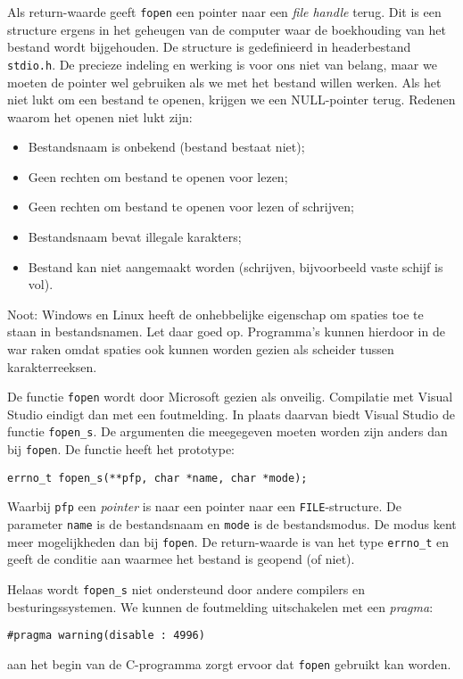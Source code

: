 Als return-waarde geeft \texttt{fopen} een pointer naar een \textsl{file handle} terug. Dit is een structure ergens in het geheugen van de computer waar de boekhouding van het bestand wordt bijgehouden. De structure is gedefinieerd in headerbestand \texttt{stdio.h}. De precieze indeling en werking is voor ons niet van belang, maar we moeten de pointer wel gebruiken als we met het bestand willen werken. Als het niet lukt om een bestand te openen, krijgen we een NULL-pointer terug. Redenen waarom het openen niet lukt zijn: 

\begin{itemize}
\item Bestandsnaam is onbekend (bestand bestaat niet);
\item Geen rechten om bestand te openen voor lezen;
\item Geen rechten om bestand te openen voor lezen of schrijven;
\item Bestandsnaam bevat illegale karakters;
\item Bestand kan niet aangemaakt worden (schrijven, bijvoorbeeld vaste schijf is vol).
\end{itemize}

Noot: Windows en Linux heeft de onhebbelijke eigenschap om spaties toe te staan in bestandsnamen. Let daar goed op. Programma's kunnen hierdoor in de war raken omdat spaties ook kunnen worden gezien als scheider tussen karakterreeksen.


\begin{infobox}
De functie \texttt{fopen} wordt door Microsoft gezien als onveilig. Compilatie met Visual Studio eindigt dan met een foutmelding. In plaats daarvan biedt Visual Studio de functie \texttt{fopen\_s}. De argumenten die meegegeven moeten worden zijn anders dan bij \texttt{fopen}. De functie heeft het prototype:

\hspace*{1em}\texttt{errno\_t fopen\_s(**pfp, char *name, char *mode);}

Waarbij \texttt{pfp} een \textsl{pointer} is naar een pointer naar een \texttt{FILE}-structure. De parameter \texttt{name} is de bestandsnaam en \texttt{mode} is de bestandsmodus. De modus kent meer mogelijkheden dan bij \texttt{fopen}. De return-waarde is van het type \texttt{errno\_t} en geeft de conditie aan waarmee het bestand is geopend (of niet).

Helaas wordt \texttt{fopen\_s} niet ondersteund door andere compilers en besturingssystemen. We kunnen de foutmelding uitschakelen met een \textsl{pragma}:

\hspace*{1em}\texttt{\#pragma warning(disable : 4996)}

aan het begin van de C-programma zorgt ervoor dat \texttt{fopen} gebruikt kan worden.
\end{infobox}


